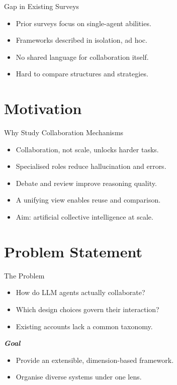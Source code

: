 \documentclass{beamer}
\begin{document}
\begin{frame}{Gap in Existing Surveys}
\begin{itemize}
  \item Prior surveys focus on single-agent abilities.
  \item Frameworks described in isolation, ad hoc.
  \item No shared language for collaboration itself.
  \item Hard to compare structures and strategies.
\end{itemize}
\end{frame}

\section{Motivation}
\begin{frame}{Why Study Collaboration Mechanisms}
\begin{itemize}
  \item Collaboration, not scale, unlocks harder tasks.
  \item Specialised roles reduce hallucination and errors.
  \item Debate and review improve reasoning quality.
  \item A unifying view enables reuse and comparison.
  \item Aim: artificial collective intelligence at scale.
\end{itemize}
\end{frame}

\section{Problem Statement}
\begin{frame}{The Problem}
\begin{itemize}
  \item How do LLM agents actually collaborate?
  \item Which design choices govern their interaction?
  \item Existing accounts lack a common taxonomy.
\end{itemize}
\textbf{\textit{Goal}}
\begin{itemize}
  \item Provide an extensible, dimension-based framework.
  \item Organise diverse systems under one lens.
\end{itemize}
\end{frame}
\end{document}
